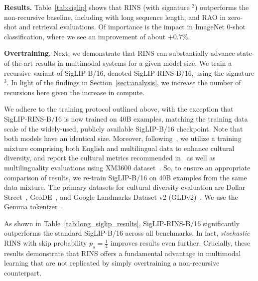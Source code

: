 \textbf{Results.} Table~\ref{tab:siglip} shows that RINS (with signature \A$^2$\B) outperforms the non-recursive baseline, including with long sequence length, and RAO in zero-shot and retrieval evaluations. Of importance is the impact in ImageNet 0-shot classification, where we see an improvement of about $+0.7\%$. 

\textbf{Overtraining.} Next, we demonstrate that RINS can substantially advance state-of-the-art results in multimodal systems for a given  model size. We train a recursive variant of SigLIP-B/16, denoted  SigLIP-RINS-B/16, using the signature \A$^3$\B. In light of the findings in Section~\ref{sect:analysis}, we increase the number of recursions here given the  increase in compute.

We adhere to the training protocol outlined above, with the exception that SigLIP-RINS-B/16 is now trained on 40B examples, matching the training data scale of the widely-used, publicly available SigLIP-B/16 checkpoint. Note that both models have an identical size. Moreover, following~\citet{pouget2024no}, we utilize a training mixture comprising both English and multilingual data to enhance cultural diversity, and report the cultural metrics recommended in~\citet{pouget2024no} as well as multilinguality evaluations using XM3600 dataset~\cite{thapliyal2022crossmodal}. So, to ensure an appropriate comparison of results, we re-train SigLIP-B/16 on 40B examples from the same data mixture. The primary datasets for cultural diversity evaluation are Dollar Street~\cite{rojas2022dollar}, GeoDE~\cite{ramaswamy2024geode}, and Google Landmarks Dataset v2 (GLDv2)~\cite{weyand2020google}. We use the Gemma tokenizer~\cite{gemmateam2024gemmaopenmodelsbased}.

As shown in Table~\ref{tab:long_siglip_results}, SigLIP-RINS-B/16 significantly outperforms the standard SigLIP-B/16 across all benchmarks. In fact, \emph{stochastic} RINS with skip probability $p_s=\frac{1}{4}$ improves results even further. Crucially, these results demonstrate that RINS offers a fundamental advantage in multimodal learning that are not replicated by simply overtraining a non-recursive counterpart.

